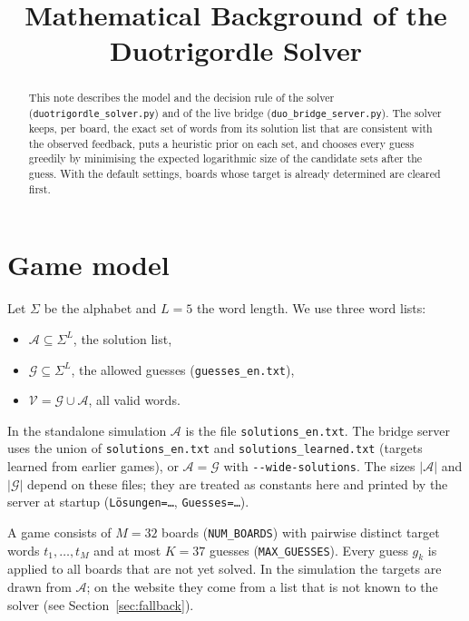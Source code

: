 \documentclass[11pt,a4paper]{article}
\title{Mathematical Background of the Duotrigordle Solver}
\author{}
\date{}
\theoremstyle{definition}
\theoremstyle{remark}
\newcommand{\G}{\mathcal{G}}
\newcommand{\A}{\mathcal{A}}
\newcommand{\V}{\mathcal{V}}
\begin{document}
\maketitle

\begin{abstract}
This note describes the model and the decision rule of the solver
(\texttt{duotrigordle\_solver.py}) and of the live bridge
(\texttt{duo\_bridge\_server.py}).
The solver keeps, per board, the exact set of words from its solution list that are
consistent with the observed feedback, puts a heuristic prior on each set, and
chooses every guess greedily by minimising the expected logarithmic size of the
candidate sets after the guess. With the default settings, boards whose target is
already determined are cleared first.
\end{abstract}

\tableofcontents

\section{Game model}

Let $\Sigma$ be the alphabet and $L=5$ the word length. We use three word lists:
\begin{itemize}
  \item $\A \subseteq \Sigma^L$, the solution list,
  \item $\G \subseteq \Sigma^L$, the allowed guesses (\texttt{guesses\_en.txt}),
  \item $\V = \G \cup \A$, all valid words.
\end{itemize}
In the standalone simulation $\A$ is the file \texttt{solutions\_en.txt}.
The bridge server uses the union of \texttt{solutions\_en.txt} and
\texttt{solutions\_learned.txt} (targets learned from earlier games), or $\A = \G$
with \texttt{-{}-wide-solutions}. The sizes $|\A|$ and $|\G|$ depend on these files;
they are treated as constants here and printed by the server at startup
(\texttt{L\"osungen=\dots}, \texttt{Guesses=\dots}).

A game consists of $M=32$ boards (\texttt{NUM\_BOARDS}) with pairwise distinct target words
$t_1,\dots,t_M$ and at most $K=37$ guesses (\texttt{MAX\_GUESSES}).
Every guess $g_k$ is applied to all boards that are not yet solved.
In the simulation the targets are drawn from $\A$; on the website they come from a list
that is not known to the solver (see Section~\ref{sec:fallback}).
\end{document}
